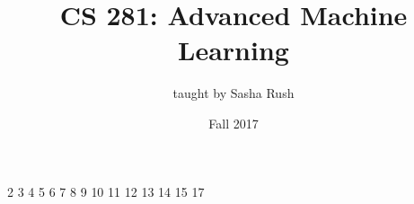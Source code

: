 \documentclass{article}
\begin{document}
\title{CS 281: Advanced Machine Learning}
\date{Fall 2017}
\author{taught by Sasha Rush}
\maketitle

\tableofcontents
\eject

{2}
{3}
{4}
{5}
{6}
{7}
{8}
{9}
{10}
{11}
{12}
{13}
{14}
{15}
{17}
\end{document}
